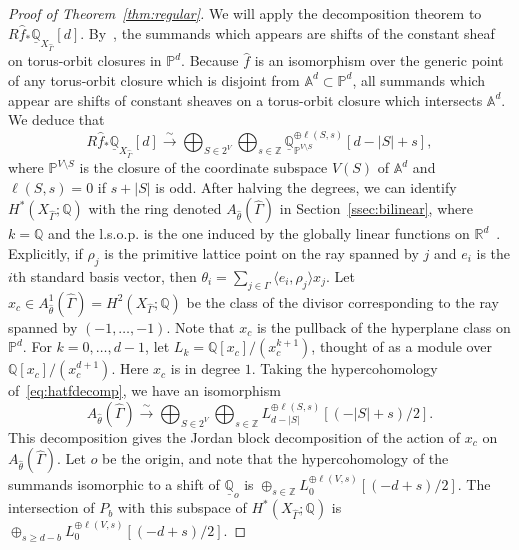\begin{proof}[Proof of Theorem~\ref{thm:regular}]
We will apply the decomposition theorem to $R\hat{f}_* \underline{\mathbb{Q}}_{X_{\hat{\Gamma}}}[d]$. By~\cite[Theorem 5.1]{deCataldoMiglioriniMustata18}, the summands which appears are shifts of the constant sheaf on torus-orbit closures in $\mathbb{P}^d$. Because $\hat{f}$ is an isomorphism over the generic point of any torus-orbit closure which is disjoint from $\mathbb{A}^d \subset \mathbb{P}^d$, all summands which appear are shifts of constant sheaves on a torus-orbit closure which intersects $\mathbb{A}^d$. We deduce that
\begin{equation}\label{eq:hatfdecomp}
R\hat{f}_* \underline{\mathbb{Q}}_{X_{\hat{\Gamma}}}[d] \stackrel{\sim}{\to} \bigoplus_{S \in 2^V} \bigoplus_{s \in \mathbb{Z}} \underline{\mathbb{Q}}_{\mathbb{P}^{V \setminus S}}^{\oplus \ell(S, s)}[d - |S| + s],
\end{equation}
where $\mathbb{P}^{V \setminus S}$ is the closure of the coordinate subspace $V(S)$ of $\mathbb{A}^d$ and $\ell(S, s) = 0$ if $s + |S|$ is odd. After halving the degrees, we can identify $H^*(X_{\hat{\Gamma}}; \mathbb{Q})$ with the ring denoted $A_{\hat{\theta}}(\hat{\Gamma})$ in Section~\ref{ssec:bilinear}, where $k=\mathbb{Q}$ and the l.s.o.p. is the one induced by the globally linear functions on $\mathbb{R}^d$~\cite[Section 5.2]{Fulton}. Explicitly, if $\rho_j$ is the primitive lattice point on the ray spanned by $j$ and $e_i$ is the $i$th standard basis vector, then $\theta_i = \sum_{j \in \Gamma} \langle e_i, \rho_j \rangle x_j$. Let $x_c \in A_{\hat{\theta}}^1(\hat{\Gamma}) = H^2(X_{\hat{\Gamma}}; \mathbb{Q})$ be the class of the divisor corresponding to the ray spanned by $(-1, \dotsc, -1)$. Note that $x_c$ is the pullback of the hyperplane class on $\mathbb{P}^d$. For $k=0, \dotsc, d-1$, let $L_k = \mathbb{Q}[x_c]/(x_c^{k+1})$,  thought of as a module over $\mathbb{Q}[x_c]/(x_c^{d+1})$. Here $x_c$ is in degree $1$. 
Taking the hypercohomology of~\eqref{eq:hatfdecomp}, we have an isomorphism
$$A_{\hat{\theta}}(\hat{\Gamma}) \stackrel{\sim}{\to} \bigoplus_{S \in 2^V} \bigoplus_{s \in \mathbb{Z}} L_{d - |S|}^{\oplus \ell(S, s)}[(- |S| + s)/2].$$
This decomposition gives the Jordan block decomposition of the action of $x_c$ on $A_{\hat{\theta}}(\hat{\Gamma})$. Let $o$ be the origin, and note that the hypercohomology of the summands isomorphic to a shift of $\underline{\mathbb{Q}}_{o}$ is $\oplus_{s \in \mathbb{Z}} L_0^{\oplus \ell(V, s)}[(- d + s)/2]$. The intersection of $P_b$ with this subspace of $H^*(X_{\hat{\Gamma}}; \mathbb{Q})$ is $\oplus_{s \ge d - b} L_0^{\oplus \ell(V, s)}[(- d + s)/2]$.

\end{proof}

